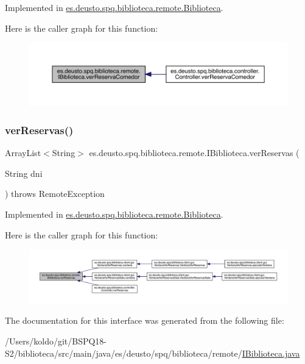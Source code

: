 Implemented in \mbox{\hyperlink{classes_1_1deusto_1_1spq_1_1biblioteca_1_1remote_1_1_biblioteca_a4bbd6c5f2df8f41fd0b5fb61564a1bfd}{es.\+deusto.\+spq.\+biblioteca.\+remote.\+Biblioteca}}.

Here is the caller graph for this function\+:
\nopagebreak
\begin{figure}[H]
\begin{center}
\leavevmode
\includegraphics[width=350pt]{interfacees_1_1deusto_1_1spq_1_1biblioteca_1_1remote_1_1_i_biblioteca_a95f0223ecd802f703977d838c72a93bf_icgraph}
\end{center}
\end{figure}
\mbox{\label{interfacees_1_1deusto_1_1spq_1_1biblioteca_1_1remote_1_1_i_biblioteca_a9ad945750f5db60c869a696e276f7421}} 
\subsubsection{\texorpdfstring{ver\+Reservas()}{verReservas()}}
{\footnotesize\ttfamily Array\+List$<$String$>$ es.\+deusto.\+spq.\+biblioteca.\+remote.\+I\+Biblioteca.\+ver\+Reservas (\begin{DoxyParamCaption}\item[{String}]{dni }\end{DoxyParamCaption}) throws Remote\+Exception}



Implemented in \mbox{\hyperlink{classes_1_1deusto_1_1spq_1_1biblioteca_1_1remote_1_1_biblioteca_a809e1bd178fbd41b865f827fd074e8c4}{es.\+deusto.\+spq.\+biblioteca.\+remote.\+Biblioteca}}.

Here is the caller graph for this function\+:
\nopagebreak
\begin{figure}[H]
\begin{center}
\leavevmode
\includegraphics[width=350pt]{interfacees_1_1deusto_1_1spq_1_1biblioteca_1_1remote_1_1_i_biblioteca_a9ad945750f5db60c869a696e276f7421_icgraph}
\end{center}
\end{figure}


The documentation for this interface was generated from the following file\+:\begin{DoxyCompactItemize}
\item 
/\+Users/koldo/git/\+B\+S\+P\+Q18-\/\+S2/biblioteca/src/main/java/es/deusto/spq/biblioteca/remote/\mbox{\hyperlink{_i_biblioteca_8java}{I\+Biblioteca.\+java}}\end{DoxyCompactItemize}
